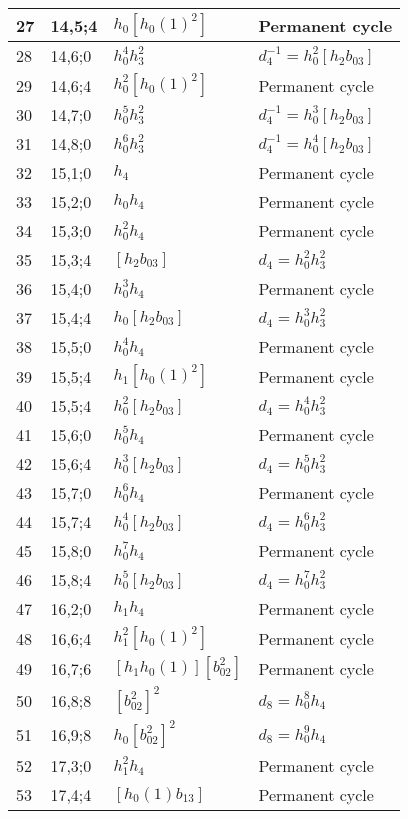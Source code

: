 \documentclass{article}
\begin{document}
\begin{longtable}{|l|l|>{\raggedright\arraybackslash}p{6cm}|>{\raggedright\arraybackslash}p{6cm}|}
\hline
27 & 14,5;4 & $h_0[h_0(1)^2]$ & Permanent cycle\\
\hline
28 & 14,6;0 & $h_0^4h_3^2$ & $d_{4}^{-1}=h_0^2[h_2b_{03}]$\\
\hline
29 & 14,6;4 & $h_0^2[h_0(1)^2]$ & Permanent cycle\\
\hline
30 & 14,7;0 & $h_0^5h_3^2$ & $d_{4}^{-1}=h_0^3[h_2b_{03}]$\\
\hline
31 & 14,8;0 & $h_0^6h_3^2$ & $d_{4}^{-1}=h_0^4[h_2b_{03}]$\\
\hline
32 & 15,1;0 & $h_4$ & Permanent cycle\\
\hline
33 & 15,2;0 & $h_0h_4$ & Permanent cycle\\
\hline
34 & 15,3;0 & $h_0^2h_4$ & Permanent cycle\\
\hline
35 & 15,3;4 & $[h_2b_{03}]$ &$d_{4}=h_0^2h_3^2$\\
\hline
36 & 15,4;0 & $h_0^3h_4$ & Permanent cycle\\
\hline
37 & 15,4;4 & $h_0[h_2b_{03}]$ &$d_{4}=h_0^3h_3^2$\\
\hline
38 & 15,5;0 & $h_0^4h_4$ & Permanent cycle\\
\hline
39 & 15,5;4 & $h_1[h_0(1)^2]$ & Permanent cycle\\
40 & 15,5;4 & $h_0^2[h_2b_{03}]$ &$d_{4}=h_0^4h_3^2$\\
\hline
41 & 15,6;0 & $h_0^5h_4$ & Permanent cycle\\
\hline
42 & 15,6;4 & $h_0^3[h_2b_{03}]$ &$d_{4}=h_0^5h_3^2$\\
\hline
43 & 15,7;0 & $h_0^6h_4$ & Permanent cycle\\
\hline
44 & 15,7;4 & $h_0^4[h_2b_{03}]$ &$d_{4}=h_0^6h_3^2$\\
\hline
45 & 15,8;0 & $h_0^7h_4$ & Permanent cycle\\
\hline
46 & 15,8;4 & $h_0^5[h_2b_{03}]$ &$d_{4}=h_0^7h_3^2$\\
\hline
47 & 16,2;0 & $h_1h_4$ & Permanent cycle\\
\hline
48 & 16,6;4 & $h_1^2[h_0(1)^2]$ & Permanent cycle\\
\hline
49 & 16,7;6 & $[h_1h_0(1)][b_{02}^2]$ & Permanent cycle\\
\hline
50 & 16,8;8 & $[b_{02}^2]^2$ &$d_{8}=h_0^8h_4$\\
\hline
51 & 16,9;8 & $h_0[b_{02}^2]^2$ &$d_{8}=h_0^9h_4$\\
\hline
52 & 17,3;0 & $h_1^2h_4$ & Permanent cycle\\
\hline
53 & 17,4;4 & $[h_0(1)b_{13}]$ & Permanent cycle\\

\end{longtable}
\end{document}
